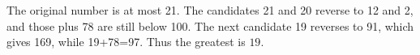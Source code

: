 The original number is at most 21. The candidates 21 and 20 reverse to 12 and 2, and those plus 78 are still below 100. The next candidate 19 reverses to 91, which gives 169, while 19+78=97. Thus the greatest is $\boxed{19}$.
